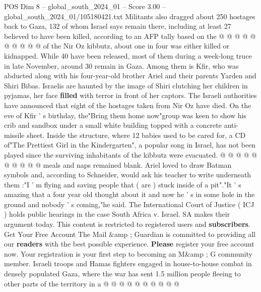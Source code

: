 \begin{textsample}{POS Dim 8 – global\_south\_2024\_01 – Score 3.00 – global\_south\_2024\_01/105180421.txt}
Militants also dragged about 250 hostages back to Gaza, 132 of whom Israel says remain there, including at least 27 believed to have been killed, according to an AFP tally based on the @ @ @ @ @ @ @ @ @ @ of the Nir Oz kibbutz, about one in four was either killed or kidnapped.
While 40 have been released, most of them during a week-long truce in late November, around 30 remain in Gaza.
Among them is Kfir, who was abducted along with his four-year-old brother Ariel and their parents Yarden and Shiri Bibas.
Israelis are haunted by the image of Shiri clutching her children in pyjamas, her face \textbf{filled} with terror in front of her captors.
The Israeli authorities have announced that eight of the hostages taken from Nir Oz have died.
On the eve of Kfir ' s birthday, the"Bring them home now"group was keen to show his crib and sandbox under a small white building topped with a concrete anti-missile sheet.
Inside the structure, where 12 babies used to be cared for, a CD of"The Prettiest Girl in the Kindergarten", a popular song in Israel, has not been played since the surviving inhabitants of the kibbutz were evacuated. @ @ @ @ @ @ @ @ @ @ meals and naps remained blank.
Ariel loved to draw Batman symbols and, according to Schneider, would ask his teacher to write underneath them :"I ' m flying and saving people that ( are ) stuck inside of a pit"."It ' s amazing that a four year old thought about it and now he ' s in some hole in the ground and nobody ' s coming,"he said.
The International Court of Justice ( ICJ ) holds public hearings in the case South Africa v.
Israel.
SA makes their argument today.
This content is restricted to registered users and \textbf{subscribers}.
Get Your Free Account The Mail \&amp ; Guardian is committed to providing all our \textbf{readers} with the best possible experience. \textbf{Please} register your free account now.
Your registration is your first step to becoming an M\&amp ; G community member.
Israeli troops and Hamas fighters engaged in house-to-house combat in densely populated Gaza, where the war has sent 1.5 million people fleeing to other parts of the territory in a @ @ @ @ @ @ @ @ @ @

\end{textsample}

